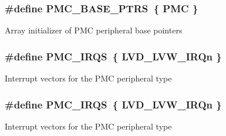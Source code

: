 \subsubsection[{\texorpdfstring{P\+M\+C\+\_\+\+B\+A\+S\+E\+\_\+\+P\+T\+RS}{PMC_BASE_PTRS}}]{\setlength{\rightskip}{0pt plus 5cm}\#define P\+M\+C\+\_\+\+B\+A\+S\+E\+\_\+\+P\+T\+RS~\{ {\bf P\+MC} \}}\hypertarget{group__PMC__Peripheral__Access__Layer_ga4bcd62643d597f7230f9c1e3d03caaa7}{}\label{group__PMC__Peripheral__Access__Layer_ga4bcd62643d597f7230f9c1e3d03caaa7}
Array initializer of P\+MC peripheral base pointers 
\subsubsection[{\texorpdfstring{P\+M\+C\+\_\+\+I\+R\+QS}{PMC_IRQS}}]{\setlength{\rightskip}{0pt plus 5cm}\#define P\+M\+C\+\_\+\+I\+R\+QS~\{ {\bf L\+V\+D\+\_\+\+L\+V\+W\+\_\+\+I\+R\+Qn} \}}\hypertarget{group__PMC__Peripheral__Access__Layer_ga55eb026c8e8941e1e4d009d8563784b0}{}\label{group__PMC__Peripheral__Access__Layer_ga55eb026c8e8941e1e4d009d8563784b0}
Interrupt vectors for the P\+MC peripheral type 
\subsubsection[{\texorpdfstring{P\+M\+C\+\_\+\+I\+R\+QS}{PMC_IRQS}}]{\setlength{\rightskip}{0pt plus 5cm}\#define P\+M\+C\+\_\+\+I\+R\+QS~\{ {\bf L\+V\+D\+\_\+\+L\+V\+W\+\_\+\+I\+R\+Qn} \}}\hypertarget{group__PMC__Peripheral__Access__Layer_ga55eb026c8e8941e1e4d009d8563784b0}{}\label{group__PMC__Peripheral__Access__Layer_ga55eb026c8e8941e1e4d009d8563784b0}
Interrupt vectors for the P\+MC peripheral type 